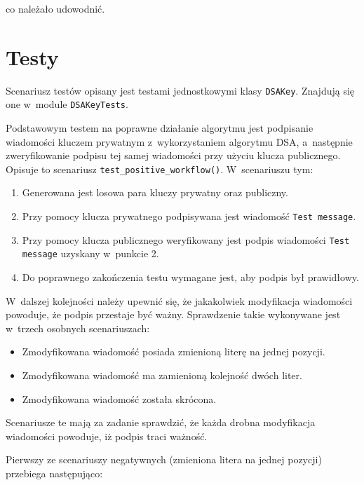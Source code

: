 \documentclass{article}
\begin{document}
            \noindent co należało udowodnić.
            
    \section*{Testy}
    
        Scenariusz testów opisany jest testami jednostkowymi klasy \verb+DSAKey+. Znajdują się one w~module \verb+DSAKeyTests+.
        
        Podstawowym testem na poprawne działanie algorytmu jest podpisanie wiadomości kluczem prywatnym z~wykorzystaniem algorytmu DSA, a~następnie zweryfikowanie podpisu tej samej wiadomości przy użyciu klucza publicznego. Opisuje to scenariusz \verb+test_positive_workflow()+. W~scenariuszu tym:
        
        \begin{enumerate}
            \item Generowana jest losowa para kluczy prywatny oraz publiczny.
            \item Przy pomocy klucza prywatnego podpisywana jest wiadomość \verb+Test message+.
            \item Przy pomocy klucza publicznego weryfikowany jest podpis wiadomości \verb+Test message+ uzyskany w~punkcie 2.
            \item Do poprawnego zakończenia testu wymagane jest, aby podpis był prawidłowy.
        \end{enumerate}

        W~dalszej kolejności należy upewnić się, że jakakolwiek modyfikacja wiadomości powoduje, że podpis przestaje być ważny. Sprawdzenie takie wykonywane jest w~trzech osobnych scenariuszach:
        
        \begin{itemize}
            \item Zmodyfikowana wiadomość posiada zmienioną literę na jednej pozycji.
            \item Zmodyfikowana wiadomość ma zamienioną kolejność dwóch liter.
            \item Zmodyfikowana wiadomość została skrócona.
        \end{itemize}
        
\noindent Scenariusze te mają za zadanie sprawdzić, że każda drobna modyfikacja wiadomości powoduje, iż podpis traci ważność.

        Pierwszy ze scenariuszy negatywnych (zmieniona litera na jednej pozycji) przebiega następująco:
        
\end{document}
